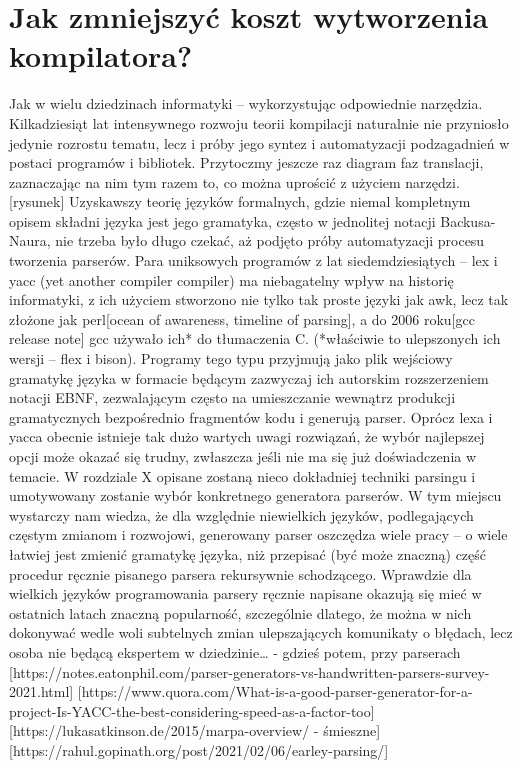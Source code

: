 \section{Jak zmniejszyć koszt wytworzenia kompilatora?}
Jak w wielu dziedzinach informatyki – wykorzystując odpowiednie narzędzia. Kilkadziesiąt lat intensywnego rozwoju teorii kompilacji naturalnie nie przyniosło jedynie rozrostu tematu, lecz i próby jego syntez i automatyzacji podzagadnień w postaci programów i bibliotek. Przytoczmy jeszcze raz diagram faz translacji, zaznaczając na nim tym razem to, co można uprościć z użyciem narzędzi.
[rysunek]
Uzyskawszy teorię języków formalnych, gdzie niemal kompletnym opisem składni języka jest jego gramatyka, często w jednolitej notacji Backusa-Naura, nie trzeba było długo czekać, aż podjęto próby automatyzacji procesu tworzenia parserów. Para uniksowych programów z lat siedemdziesiątych – lex i yacc (yet another compiler compiler) ma niebagatelny wpływ na historię informatyki, z ich użyciem stworzono nie tylko tak proste języki jak awk, lecz tak złożone jak perl[ocean of awareness, timeline of parsing], a do 2006 roku[gcc release note] gcc używało ich* do tłumaczenia C.
(*właściwie to ulepszonych ich wersji – flex i bison). 
Programy tego typu przyjmują jako plik wejściowy gramatykę języka w formacie będącym zazwyczaj ich autorskim rozszerzeniem notacji EBNF, zezwalającym często na umieszczanie wewnątrz produkcji gramatycznych bezpośrednio fragmentów kodu i generują parser. Oprócz lexa i yacca obecnie istnieje tak dużo wartych uwagi rozwiązań, że wybór najlepszej opcji może okazać się trudny, zwłaszcza jeśli nie ma się już doświadczenia w temacie. W rozdziale X opisane zostaną nieco dokładniej techniki parsingu i umotywowany zostanie wybór konkretnego generatora parserów. W tym miejscu wystarczy nam wiedza, że dla względnie niewielkich języków, podlegających częstym zmianom i rozwojowi, generowany parser oszczędza wiele pracy – o wiele łatwiej jest zmienić gramatykę języka, niż przepisać (być może znaczną) część procedur ręcznie pisanego parsera rekursywnie schodzącego. Wprawdzie dla wielkich języków programowania parsery ręcznie napisane okazują się mieć w ostatnich latach znaczną popularność, szczególnie dlatego, że można w nich dokonywać wedle woli subtelnych zmian ulepszających komunikaty o błędach, lecz osoba nie będącą ekspertem w dziedzinie… - gdzieś potem, przy parserach
[https://notes.eatonphil.com/parser-generators-vs-handwritten-parsers-survey-2021.html]
[https://www.quora.com/What-is-a-good-parser-generator-for-a-project-Is-YACC-the-best-considering-speed-as-a-factor-too]
[https://lukasatkinson.de/2015/marpa-overview/ - śmieszne]
[https://rahul.gopinath.org/post/2021/02/06/earley-parsing/]

